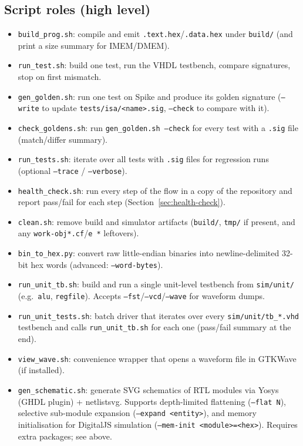 \subsection{Script roles (high level)}
\begin{itemize}[leftmargin=*]
  \item \texttt{build\_prog.sh}: compile and emit \texttt{.text.hex}/\texttt{.data.hex} under \texttt{build/} (and print a size summary for IMEM/DMEM).
  \item \texttt{run\_test.sh}: build one test, run the VHDL testbench, compare signatures, stop on first mismatch.
  \item \texttt{gen\_golden.sh}: run one test on Spike and produce its golden signature (\texttt{--write} to update \texttt{tests/isa/<name>.sig}, \texttt{--check} to compare with it).
  \item \texttt{check\_goldens.sh}: run \texttt{gen\_golden.sh --check} for every test with a \texttt{.sig} file (match/differ summary).
  \item \texttt{run\_tests.sh}: iterate over all tests with \texttt{.sig} files for regression runs (optional \texttt{--trace} / \texttt{--verbose}).
  \item \texttt{health\_check.sh}: run every step of the flow in a copy of the repository and report pass/fail for each step (Section~\ref{sec:health-check}).
  \item \texttt{clean.sh}: remove build and simulator artifacts (\texttt{build/}, \texttt{tmp/} if present, and any \texttt{work-obj*.cf}/\texttt{e\string~*} leftovers).
  \item \texttt{bin\_to\_hex.py}: convert raw little-endian binaries into newline-delimited 32-bit hex words (advanced: \texttt{--word-bytes}).
  \item \texttt{run\_unit\_tb.sh}: build and run a single unit-level testbench from \texttt{sim/unit/} (e.g.\ \texttt{alu}, \texttt{regfile}). Accepts \texttt{--fst}/\texttt{--vcd}/\texttt{--wave} for waveform dumps.
  \item \texttt{run\_unit\_tests.sh}: batch driver that iterates over every \texttt{sim/unit/tb\_*.vhd} testbench and calls \texttt{run\_unit\_tb.sh} for each one (pass/fail summary at the end).
  \item \texttt{view\_wave.sh}: convenience wrapper that opens a waveform file in GTKWave (if installed).
  \item \texttt{gen\_schematic.sh}: generate SVG schematics of RTL modules via Yosys (GHDL plugin) + netlistsvg. Supports depth-limited flattening (\texttt{--flat N}), selective sub-module expansion (\texttt{--expand <entity>}), and memory initialisation for DigitalJS simulation (\texttt{--mem-init <module>=<hex>}). Requires extra packages; see above.

\end{itemize}

